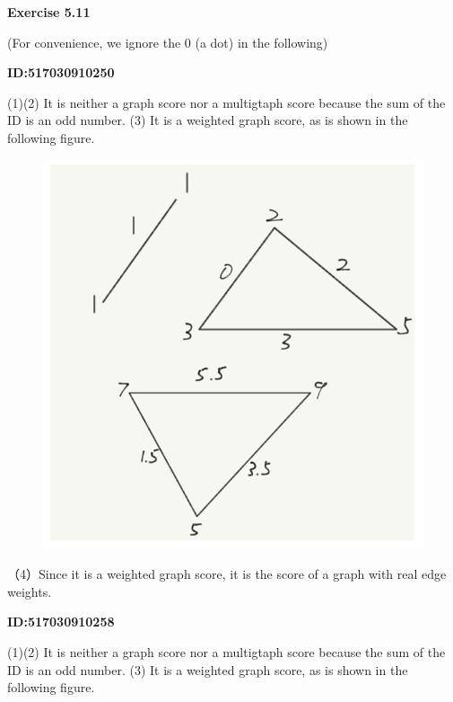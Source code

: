 \documentclass{article} %
\begin{document}
	\textbf{Exercise 5.11}\par
	(For convenience, we ignore the 0 (a dot) in the following)\par
	\textbf{ID:517030910250}\par
	(1)(2) It is neither a graph score nor a multigtaph score because the sum of the ID is an odd number.
	(3) It is a weighted graph score, as is shown in the following figure.
	
	\begin{figure}[H]
		\centering
		\includegraphics[scale=0.6]{10250.png}
		\caption{}
		\label{fig:1}
	\end{figure}
	（4）Since it is a weighted graph score, it is the score of a graph with real edge weights.

	\textbf{ID:517030910258}\par
	(1)(2) It is neither a graph score nor a multigtaph score because the sum of the ID is an odd number.
	(3) It is a weighted graph score, as is shown in the following figure.
	
\end{document}
